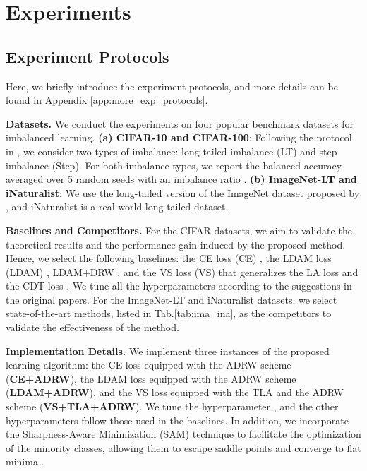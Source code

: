\section{Experiments}
\label{sec:experiment}
\subsection{Experiment Protocols}
Here, we briefly introduce the experiment protocols, and more details can be found in Appendix \ref{app:more_exp_protocols}.

\textbf{Datasets.} We conduct the experiments on four popular benchmark datasets for imbalanced learning. \textbf{(a) CIFAR-10 and CIFAR-100}: Following the protocol in \cite{DBLP:journals/nn/BudaMM18,DBLP:conf/cvpr/CuiJLSB19,DBLP:conf/nips/CaoWGAM19}, we consider two types of imbalance: long-tailed imbalance (LT) and step imbalance (Step). For both imbalance types, we report the balanced accuracy averaged over 5 random seeds with an imbalance ratio . \textbf{(b) ImageNet-LT and iNaturalist}: We use the long-tailed version of the ImageNet dataset\footnotemark[2] \cite{DBLP:journals/ijcv/RussakovskyDSKS15} proposed by \cite{DBLP:conf/cvpr/0002MZWGY19}, and iNaturalist\footnotemark[3] \cite{DBLP:conf/cvpr/HornASCSSAPB18} is a real-world long-tailed dataset.

\textbf{Baselines and Competitors.} For the CIFAR datasets, we aim to validate the theoretical results and the performance gain induced by the proposed method. Hence, we select the following baselines: the CE loss (CE) \cite{10.5555/2371238}, the LDAM loss (LDAM) \cite{DBLP:conf/nips/CaoWGAM19}, LDAM+DRW \cite{DBLP:conf/nips/CaoWGAM19}, and the VS loss (VS) \cite{DBLP:conf/nips/KiniPOT21} that generalizes the LA loss \cite{DBLP:conf/iclr/MenonJRJVK21} and the CDT loss \cite{DBLP:journals/corr/abs-2001-01385}. We tune all the hyperparameters according to the suggestions in the original papers. For the ImageNet-LT and iNaturalist datasets, we select state-of-the-art methods, listed in Tab.\ref{tab:ima_ina}, as the competitors to validate the effectiveness of the method.

\textbf{Implementation Details.} We implement three instances of the proposed learning algorithm: the CE loss equipped with the ADRW scheme ({\textbf{CE+ADRW}}), the LDAM loss equipped with the ADRW scheme ({\textbf{LDAM+ADRW}}), and the VS loss equipped with the TLA and the ADRW scheme ({\textbf{VS+TLA+ADRW}}). We tune the hyperparameter , and the other hyperparameters follow those used in the baselines. In addition, we incorporate the Sharpness-Aware Minimization (SAM) technique \cite{DBLP:conf/iclr/ForetKMN21} to facilitate the optimization of the minority classes, allowing them to escape saddle points and converge to flat minima \cite{rangwani2022escaping}. 

